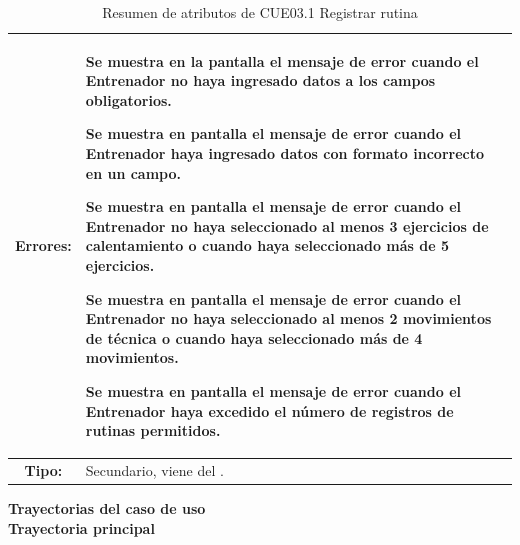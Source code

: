 \begin{table}[H]
\begin{tabular}{| c | p{12 cm} |}
\textbf{Errores:} & \vspace{-2mm}	%
					\begin{compactitem}
						\setlength\itemsep{-0.25em}
						\item Se muestra en la pantalla \nameref{pant:IUE03.1} el mensaje de error \nameref{msj:MSG12} cuando el Entrenador no haya ingresado datos a los campos obligatorios.
						\item Se muestra en pantalla el mensaje de error \nameref{msj:MSG13} cuando el Entrenador haya ingresado datos con formato incorrecto en un campo.
						\item Se muestra en pantalla el mensaje de error \nameref{msj:MSG16} cuando el Entrenador no haya seleccionado al menos 3 ejercicios de calentamiento o cuando haya seleccionado más de 5 ejercicios.
						\item Se muestra en pantalla el mensaje de error \nameref{msj:MSG16} cuando el Entrenador no haya seleccionado al menos 2 movimientos de técnica o cuando haya seleccionado más de 4 movimientos.
						\item Se muestra en pantalla el mensaje de error \nameref{msj:MSG20} cuando el Entrenador haya excedido el número de registros de rutinas permitidos.
					\end{compactitem}\\
\hline
\textbf{Tipo:} & Secundario, viene del \nameref{cu:CUE03}.\\
\hline	
\end{tabular}
\caption{Resumen de atributos de CUE03.1 Registrar rutina}
\label{tab:CUE031}
\end{table} 

\textbf{\textcolor[rgb]{0, 0, 0.545098}{Trayectorias del caso de uso}} \\

\textbf{\large{Trayectoria principal}}

